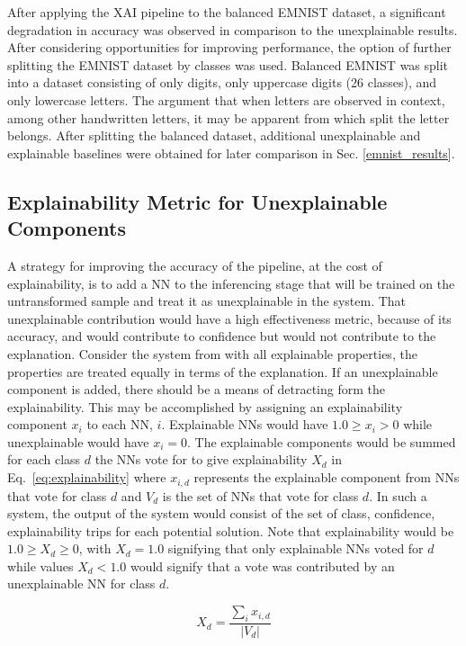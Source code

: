 \documentclass[conference]{IEEEtran}
\begin{document}
After applying the XAI pipeline to the balanced EMNIST dataset, a significant
degradation in accuracy was observed in comparison to the unexplainable results.
After considering opportunities for improving performance, the option of further
splitting the EMNIST dataset by classes was used.  Balanced EMNIST was
split into a dataset consisting of only digits, only uppercase digits (26
classes), and only lowercase letters.  The argument that when letters are
observed in context, among other handwritten letters, it may be apparent from
which split the letter belongs.  After splitting the balanced dataset,
additional unexplainable and explainable baselines were obtained for later
comparison in Sec. \ref{emnist_results}.

\subsection{Explainability Metric for Unexplainable Components}

A strategy for improving the accuracy of the pipeline, at the cost of
explainability, is to add a NN to the inferencing stage that will be trained on
the untransformed sample and treat it as unexplainable in the system.  That
unexplainable contribution would have a high effectiveness metric, because of
its accuracy, and would contribute to confidence but would not contribute to the
explanation.  Consider the system from \cite{whitten21} with all explainable
properties, the properties are treated equally in terms of the explanation. If
an unexplainable component is added, there should be a means of detracting form
the explainability. This may be accomplished by assigning an explainability
component $x_i$ to each NN, $i$.  Explainable NNs would have $1.0 \geq x_i > 0$
while unexplainable would have $x_i = 0$.  The explainable components would be
summed for each class $d$ the NNs vote for to give explainability $X_d$ in
Eq.~\ref{eq:explainability} where $x_{i,d}$ represents the explainable component
from NNs that vote for class $d$ and $V_d$ is the set of NNs that vote for class
$d$.  In such a system, the output of the system would consist of the set of
class, confidence, explainability trips for each potential solution.  Note that
explainability would be $1.0 \geq X_d \geq 0$, with $X_d = 1.0$ signifying that
only explainable NNs voted for $d$ while values $X_d < 1.0$ would signify that a
vote was contributed by an unexplainable NN for class $d$.


\begin{equation}
    X_d=\frac{\sum_i x_{i,d}}{|V_d|}
    \label{eq:explainability}
\end{equation}
\end{document}
